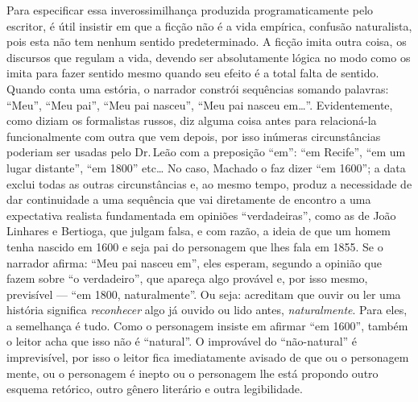 Para especificar essa inverossimilhança produzida programaticamente pelo
escritor, é útil insistir em que a ficção não é a vida empírica,
confusão naturalista, pois esta não tem nenhum sentido predeterminado. A
ficção imita outra coisa, os discursos que regulam a vida, devendo ser
absolutamente lógica no modo como os imita para fazer sentido mesmo
quando seu efeito é a total falta de sentido. Quando conta uma estória,
o narrador constrói sequências somando palavras: ``Meu'', ``Meu pai'', ``Meu
pai nasceu'', ``Meu pai nasceu em\ldots{}''. Evidentemente, como diziam os
formalistas russos, diz alguma coisa antes para relacioná-la
funcionalmente com outra que vem depois, por isso inúmeras
circunstâncias poderiam ser usadas pelo Dr.\,Leão com a preposição ``em'':
``em Recife'', ``em um lugar distante'', ``em 1800'' etc\ldots{} No caso, Machado o
faz dizer ``em 1600''; a data exclui todas as outras circunstâncias e, ao
mesmo tempo, produz a necessidade de dar continuidade a uma sequência
que vai diretamente de encontro a uma expectativa realista fundamentada
em opiniões ``verdadeiras'', como as de João Linhares e Bertioga, que
julgam falsa, e com razão, a ideia de que um homem tenha nascido em 1600
e seja pai do personagem que lhes fala em 1855. Se o narrador afirma:
``Meu pai nasceu em'', eles esperam, segundo a opinião que fazem sobre ``o
verdadeiro'', que apareça algo provável e, por isso mesmo, previsível ---
``em 1800, naturalmente''. Ou seja: acreditam que ouvir ou ler uma
história significa \emph{reconhecer} algo já ouvido ou lido antes,
\emph{naturalmente}. Para eles, a semelhança é tudo. Como o personagem
insiste em afirmar ``em 1600'', também o leitor acha que isso não é
``natural''. O improvável do ``não-natural'' é imprevisível, por isso o
leitor fica imediatamente avisado de que ou o personagem mente, ou o
personagem é inepto ou o personagem lhe está propondo outro esquema
retórico, outro gênero literário e outra legibilidade.

